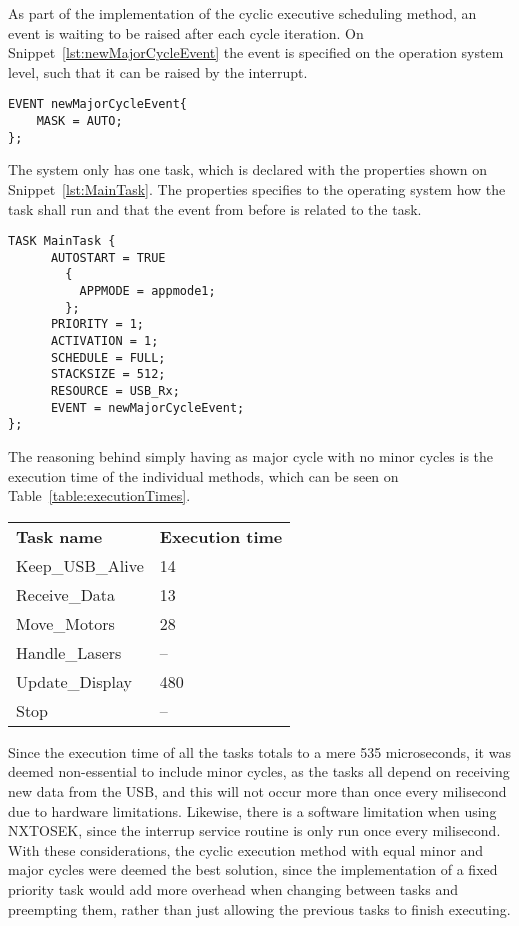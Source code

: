As part of the implementation of the cyclic executive scheduling method, an event is waiting to be raised after each cycle iteration. 
On Snippet~\ref{lst:newMajorCycleEvent} the event is specified on the operation system level, such that it can be raised by the interrupt. 
\begin{lstlisting}[language=CSharp,label={lst:newMajorCycleEvent},caption={newMajorCycleEvent event from nxt.oil}]
EVENT newMajorCycleEvent{
    MASK = AUTO;
};
\end{lstlisting}

The system only has one task, which is declared with the properties shown on Snippet~\ref{lst:MainTask}. 
The properties specifies to the operating system how the task shall run and that the event from before is related to the task.
\begin{lstlisting}[language=CSharp,label={lst:MainTaskoil},caption={MainTaks task from nxt.oil}]
    TASK MainTask {
      AUTOSTART = TRUE 
        {
          APPMODE = appmode1;
        };
      PRIORITY = 1;
      ACTIVATION = 1;
      SCHEDULE = FULL;
      STACKSIZE = 512;
      RESOURCE = USB_Rx;
      EVENT = newMajorCycleEvent;
};
\end{lstlisting}

The reasoning behind simply having as major cycle with no minor cycles is the execution time of the individual methods, which can be seen on Table~\ref{table:executionTimes}.

\begin{table}[tbp]
\begin{tabular}{ll}
\textbf{Task name}  & \textbf{Execution time} \\
Keep\_USB\_Alive    & 14                            \\
Receive\_Data       & 13                            \\
Move\_Motors        & 28                            \\
Handle\_Lasers      & --                            \\
Update\_Display     & 480                           \\
Stop                & --                            
\end{tabular}
\end{table}\label{table:executionTimes}

Since the execution time of all the tasks totals to a mere 535 microseconds, it was deemed non-essential to include minor cycles, as the tasks all depend on receiving new data from the USB, and this will not occur more than once every milisecond due to hardware limitations.
Likewise, there is a software limitation when using NXTOSEK, since the interrup service routine is only run once every milisecond.
With these considerations, the cyclic execution method with equal minor and major cycles were deemed the best solution, since the implementation of a fixed priority task would add more overhead when changing between tasks and preempting them, rather than just allowing the previous tasks to finish executing.

